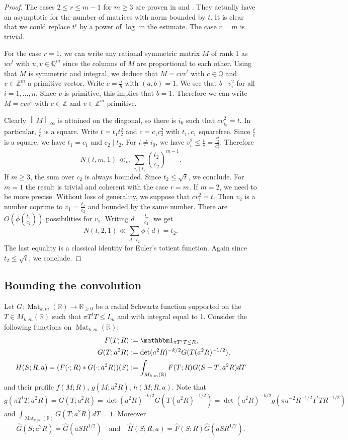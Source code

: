 \documentclass[oneside]{amsart}
\numberwithin{equation}{section}
\theoremstyle{definition}
\theoremstyle{remark}
\theoremstyle{remark}
\newcommand{\onebb}{\mathbbm 1}
\newcommand{\QQ}{\mathbb Q}
\newcommand{\RR}{\mathbb R}
\newcommand{\ZZ}{\mathbb Z}
\newcommand{\norm}[1]{\left\lVert #1\right\rVert}		%
\newcommand{\divides}{\mid}
\DeclareMathOperator{\Mat}{Mat}
\begin{document}
\begin{proof}
The cases $2\leq r\leq m-1$ for $m\geq3$ are proven in \cite{EK95} and \cite{Sch95a}. They actually have an asymptotic for the number of matrices with norm bounded by $t$. It is clear that we could replace $t^\epsilon$ by a power of $\log$ in the estimate. The case $r=m$ is trivial.

For the case $r=1$, we can write any rational symmetric matrix $M$ of rank 1 as $uv^t$ with $u,v\in\QQ^m$ since the columns of $M$ are proportional to each other. Using that $M$ is symmetric and integral, we deduce that $M=cvv^t$ with $c\in\QQ$ and $v\in\ZZ^m$ a primitive vector. Write $c=\frac ab$ with $(a,b)=1$. We see that $b\divides v_i^2$ for all $i=1,\dots,n$. Since $v$ is primitive, this implies that $b=1$. Therefore we can write $M=cvv^t$ with $c\in\ZZ$ and $v\in\ZZ^m$ primitive.

Clearly $\norm M_\infty$ is attained on the diagonal, so there is $i_0$ such that $cv_{i_0}^2=t$. In particular, $\frac tc$ is a square. Write $t=t_1t_2^2$ and $c=c_1c_2^2$ with $t_1,c_1$ squarefree. Since $\frac tc$ is a square, we have $t_1=c_1$ and $c_2\divides t_2$. For $i\neq i_0$, we have $v_i^2\leq\frac tc=\frac{t_2^2}{c_2^2}$. Therefore
$$N(t,m,1)\ll_m\sum_{c_2\divides t_2}\left(\frac{t_2}{c_2}\right)^{m-1}.$$
If $m\geq3$, the sum over $c_2$ is always bounded. Since $t_2\leq\sqrt t$, we conclude. For $m=1$ the result is trivial and coherent with the case $r=m$. If $m=2$, we need to be more precise. Without loss of generality, we suppose that $cv_1^2=t$. Then $v_2$ is a number coprime to $v_1=\frac{t_2}{c_2}$ and bounded by the same number. There are $O(\phi(\frac{t_2}{c_2}))$ possibilities for $v_1$. Writing $d=\frac{t_2}{c_2}$, we get
$$N(t,2,1)\ll\sum_{d\divides t_2}\phi(d)=t_2.$$
The last equality is a classical identity for Euler's totient function. Again since $t_2\leq\sqrt t$, we conclude.
\end{proof}


\subsection{Bounding the convolution}
Let $G:\Mat_{k,m}(\RR)\to\RR_{\geq0}$ be a radial Schwartz function supported on the $T\in M_{k,m}(\RR)$ such that $\pi T^tT\leq I_m$ and with integral equal to 1. Consider the following functions on $\Mat_{k,m}(\RR)$:
\begin{align*}
F(T;R)&:=\onebb_{\pi T^tT\leq R},\\
G(T;a^2R)&:=\det(a^2R)^{-k/2}G(T(a^2R)^{-1/2}),\\
H(S;R,a)=(F(\cdot;R)\ast G(\cdot;a^2R))(S)&:=\int_{M_{k,m}(\RR)}F(T;R)G(S-T;a^2R)dT
\end{align*}
and their profile $f(M;R)$, $g(M;a^2R)$, $h(M;R,a)$. Note that
$$g(\pi T^tT;a^2R)=G(T;a^2R)=\det(a^2R)^{-k/2}G(T(a^2R)^{-1/2})=\det(a^2R)^{-k/2}g(\pi a^{-2}R^{-1/2}T^tTR^{-1/2})$$
and $\int_{\Mat_{k,m}(\RR)}G(T;a^2R)dT=1$. Moreover
$$\hat G(S;a^2R)=\hat G(aSR^{1/2})\quad\text{and}\quad\hat H(S;R,a)=\hat F(S;R)\hat G(aSR^{1/2}).$$
\end{document}
